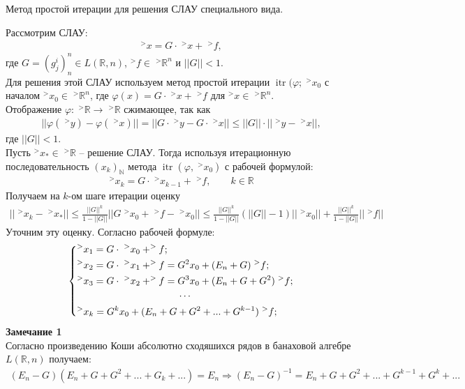 \documentclass[__main__.tex]{subfiles}
\begin{document}
Метод простой итерации для решения СЛАУ специального вида.


Рассмотрим СЛАУ:
\begin{gather*}
^>x=G\cdot \;^>x+\;^>f,
\end{gather*}
где $G=(g^i_j)^n_n \in L(\mathbb R, n)$, $^>f \in \;^>\mathbb R^n$ и $||G||<1$.\\
Для решения этой СЛАУ используем метод простой итерации $\operatorname{itr}(\varphi; \;^>x_0$ с началом $^>x_0\in \;^>\mathbb R^n$, где $\varphi(x)=G\cdot \;^>x+\;^>f$ для $^>x \in \;^> \mathbb R^n$. \\
Отображение $\varphi: \;^>\mathbb R \rightarrow \;^>\mathbb R$ сжимающее, так как 
\begin{gather*}
||\varphi(\;^>y)-\varphi(\;^>x)||=||G\cdot \;^>y -G\cdot \;^>x|| \leqslant ||G||\cdot ||\;^>y-\;^>x||, 
\end{gather*}
где $||G||<1$.\\
Пусть $^>x_*\in \;^>\mathbb R$ -- решение СЛАУ. Тогда используя итерационную последовательность $(x_k)_{\mathbb N}$ метода $\operatorname{itr}(\varphi, \;^>x_0)$ с рабочей формулой:
\begin{gather*}
^>x_k=G\cdot \;^>x_{k-1}+\;^>f, \qquad k\in \mathbb R
\end{gather*}
Получаем на $k$-ом шаге итерации оценку
\begin{gather*}
||\;^>x_k-\;^>x_*||\leqslant \frac{||G||^k}{1-||G||}||G\;^>x_0+\;^>f-\;^>x_0||\leqslant \frac{||G||^k}{1-||G||}(||G||-1)||\;^>x_0||+\frac{||G||^k}{1-||G||}||\;^>f||
\end{gather*}
Уточним эту оценку. Согласно рабочей формуле:
\begin{gather*}
\left\{
	\begin{gathered}
	^>x_1=G\cdot\;^>x_0+^>f; \hfill \\
	^>x_2=G\cdot\;^>x_1+^>f=G^2x_0+(E_n+G)\;^>f; \hfill \\
	^>x_3=G\cdot\;^>x_2+^>f=G^3x_0+(E_n+G+G^2)\;^>f; \hfill \\
	\cdots \\
	^>x_k=G^kx_0+(E_n+G+G^2+...+G^{k-1})\;^>f; \hfill \\
	\end{gathered}
\right.
\end{gather*}
\textbf{Замечание 1}\\
Согласно произведению Коши абсолютно сходяшихся рядов в банаховой алгебре $L(\mathbb R, n)$ получаем:
\begin{gather*}
(E_n-G)(E_n+G+G^2+...+G_k+...)=E_n \Longrightarrow (E_n-G)^{-1}=E_n+G+G^2+...+G^{k-1}+G^k+...
\end{gather*}
\end{document}
